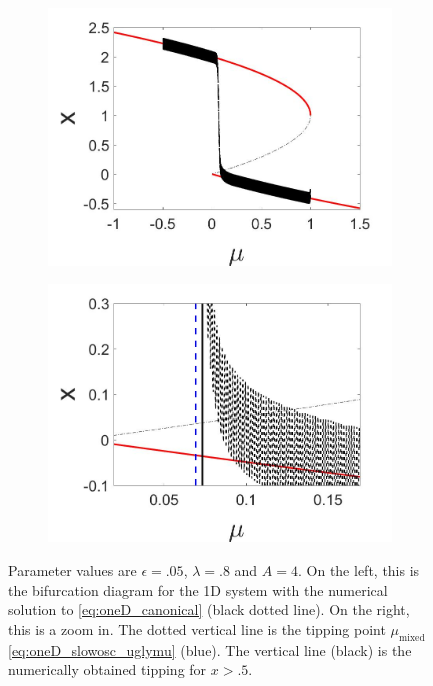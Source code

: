 \begin{figure}[H]
\centering
\begin{subfigure}{.5\textwidth}
 \centering
 \includegraphics[width=\linewidth]{oneD/slowosc_bif_diagram_small.jpg}
 \caption{}
\end{subfigure}%
\begin{subfigure}{.5\textwidth}
 \centering
 \includegraphics[width=\linewidth]{oneD/slowosc_bif_diagram_small_zoom.jpg}
 \caption{}
\end{subfigure}
\caption{Parameter values are $\epsilon=.05$, $\lambda=.8$ and $A=4$. On the left, this is the bifurcation diagram for the 1D system with the numerical solution to \eqref{eq:oneD_canonical} (black dotted line). On the right, this is a zoom in. The dotted vertical line is the tipping point $\mu_{\text{mixed}}$ \eqref{eq:oneD_slowosc_uglymu} (blue). The vertical line (black) is the numerically obtained tipping for $x>.5$.}
\label{fig:oneD_slowosc_numerical_small}
\end{figure}

